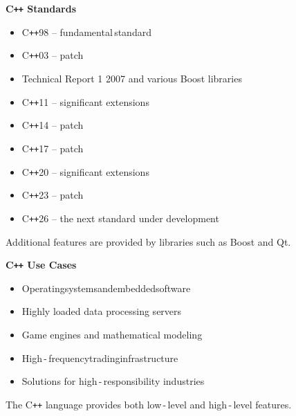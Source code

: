 \documentclass{beamer}
\begin{document}
\begin{frame}{\bf C\texttt{++} Standards}

    \begin{itemize}

        \item C\texttt{++}98 -- fundamental\,standard

        \item C\texttt{++}03 -- patch

        \item Technical Report 1 2007 and various Boost libraries

        \item C\texttt{++}11 -- significant extensions

        \item C\texttt{++}14 -- patch

        \item C\texttt{++}17 -- patch

        \item C\texttt{++}20 -- significant extensions

        \item C\texttt{++}23 -- patch

        \item C\texttt{++}26 -- the next standard under development
         
    \end{itemize}

    \begin{block}
    \justifying Additional features are provided by libraries such as Boost and Qt.
    \end{block}
    
\end{frame}

\begin{frame}{\bf C\texttt{++} Use Cases}
    
    \begin{itemize}

        \item Operating\;systems\;and\;embedded\;software

        \item Highly loaded data processing servers

        \item Game engines and mathematical modeling

        \item High\,-\,frequency\:trading\:infrastructure

        \item Solutions for high\,-\,responsibility industries
        
    \end{itemize}

    \begin{block}
    \justifying The C\texttt{++} language provides both low\,-\,level and high\,-\,level features.
    \end{block}
    
\end{frame}
\end{document}
